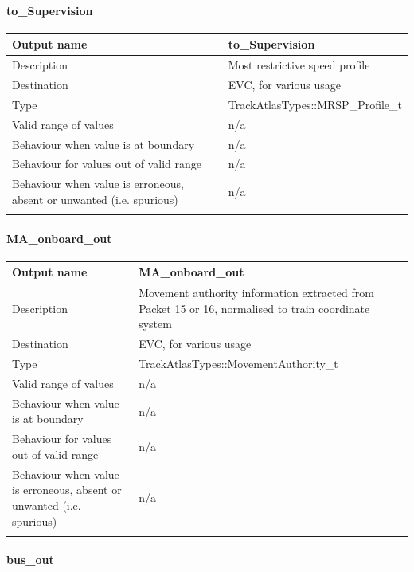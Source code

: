 \paragraph{to\_Supervision}

\begin{longtable}{p{}p{}}
\toprule
Output name				& to\_Supervision \\
\midrule
Description				& Most restrictive speed profile \\
\midrule
Destination				& EVC, for various usage  \\ 
\midrule
Type					& TrackAtlasTypes::MRSP\_Profile\_t\\
\midrule
Valid range of values	& n/a \\
\midrule
Behaviour when value is at boundary	& n/a  \\
\midrule
Behaviour for values out of valid range	& n/a  \\
\midrule
Behaviour when value is erroneous, absent or unwanted (i.e. spurious) & n/a  \\
\\
\bottomrule
\end{longtable}

\paragraph{MA\_onboard\_out}

\begin{longtable}{p{}p{}}
\toprule
Output name				& MA\_onboard\_out \\
\midrule
Description				& Movement authority information extracted from Packet 15 or 16, normalised to train coordinate system\\
\midrule
Destination				& EVC, for various usage  \\ 
\midrule
Type					& TrackAtlasTypes::MovementAuthority\_t\\
\midrule
Valid range of values	& n/a \\
\midrule
Behaviour when value is at boundary	& n/a  \\
\midrule
Behaviour for values out of valid range	& n/a  \\
\midrule
Behaviour when value is erroneous, absent or unwanted (i.e. spurious) & n/a  \\
\\
\bottomrule
\end{longtable}

\paragraph{bus\_out}

